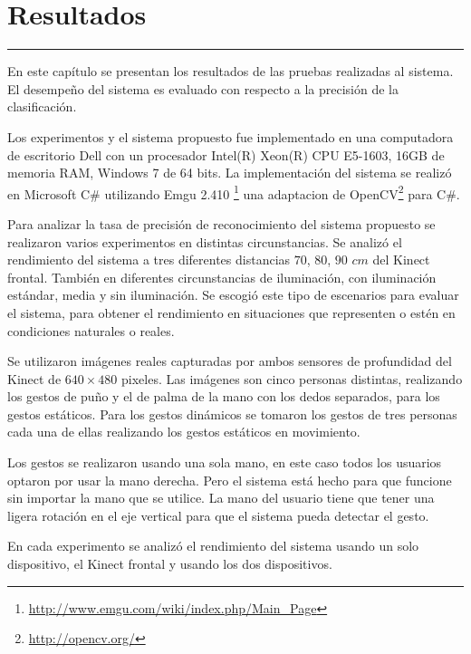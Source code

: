 \chapter{Resultados}\label{capit:cap5}
\vspace{-2.0325ex}%
\noindent
\rule{\textwidth}{0.5pt}
\vspace{-5.5ex}%
\newcommand{\pushline}{\Indp}%

En este capítulo se presentan los resultados de las pruebas realizadas al sistema. El desempeño del sistema es evaluado con respecto a la precisi\'on de la clasificación.   

Los experimentos y el sistema propuesto fue implementado en una computadora de escritorio Dell con un procesador Intel(R) Xeon(R) CPU E5-1603, 16GB de memoria RAM, Windows 7 de 64 bits. La implementación del sistema se realizó en Microsoft C\# utilizando Emgu 2.410 \footnote{\url{http://www.emgu.com/wiki/index.php/Main\_Page}} una adaptacion de OpenCV\footnote{\url{http://opencv.org/}} para C\#. 

Para analizar la tasa de precisión de reconocimiento del sistema propuesto se realizaron varios experimentos en distintas circunstancias. Se analizó el rendimiento del sistema a tres diferentes distancias $70$, $80$, $90$ $cm$ del Kinect frontal. También en diferentes circunstancias de iluminación, con iluminación estándar, media y sin iluminación. Se escogió este tipo de escenarios para evaluar el sistema, para obtener el rendimiento en situaciones que representen o estén en condiciones naturales o reales.

Se utilizaron imágenes reales capturadas por ambos sensores de profundidad del Kinect de $640 \times 480$ pixeles. Las imágenes son cinco personas distintas, realizando los gestos de puño y el de palma de la mano con los dedos separados, para los gestos estáticos. Para los gestos dinámicos se tomaron los gestos de tres personas cada una de ellas realizando los gestos estáticos en movimiento.

Los gestos se realizaron usando una sola mano, en este caso todos los usuarios optaron por usar la mano derecha. Pero el sistema est\'a hecho para que funcione sin importar la mano que se utilice. La mano del usuario tiene que tener una ligera rotación en el eje vertical para que el sistema pueda detectar el gesto.

En cada experimento se analiz\'o el rendimiento del sistema usando un solo dispositivo, el Kinect frontal y usando los dos dispositivos.  



